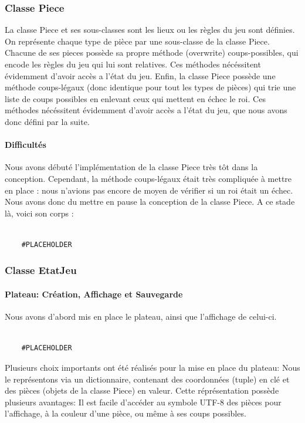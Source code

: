 \documentclass{article}
\begin{document}
\subsubsection{Classe Piece}
La classe Piece et ses sous-classes sont les lieux ou les règles du jeu sont définies.
On représente chaque type de pièce par une sous-classe de la classe Piece.
Chacune de ses pieces possède sa propre méthode (overwrite) coups-possibles, qui encode les règles du jeu
qui lui sont relatives. Ces méthodes nécéssitent évidemment d'avoir accès a l'état du jeu.
Enfin, la classe Piece possède une méthode coups-légaux (donc identique pour tout les types de pièces)
qui trie une liste de coups possibles en enlevant ceux qui mettent en échec le roi.
Ces méthodes nécéssitent évidemment d'avoir accès a l'état du jeu, que nous avons donc défini par la suite.
\paragraph{Difficultés}
Nous avons débuté  l'implémentation de la classe Piece très tôt dans la conception. Cependant, la méthode 
coups-légaux était très compliquée à mettre en place : nous n'avions pas encore
de moyen de vérifier si un roi était un échec. Nous avons donc du mettre en pause
la conception de la classe Piece. A ce stade là, voici son corps : 


\begin{verbatim}

    #PLACEHOLDER
\end{verbatim}
\subsubsection{Classe EtatJeu}
\paragraph{Plateau: Création, Affichage et Sauvegarde}
Nous avons d'abord mis en place le plateau, ainsi que l'affichage de celui-ci.
\begin{verbatim}

    #PLACEHOLDER
\end{verbatim}

Plusieurs choix importants ont été réalisés pour la mise en place du plateau:
Nous le représentons via un dictionnaire, contenant des coordonnées (tuple) en clé
et des pièces (objets de la classe Piece) en valeur. Cette réprésentation
possède plusieurs avantages: Il est facile d'accéder au symbole UTF-8 des pièces
pour l'affichage, à la couleur d'une pièce, ou même à ses coups possibles.
\end{document}
